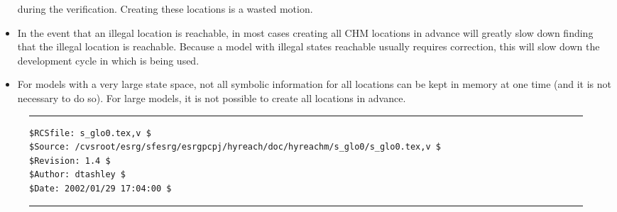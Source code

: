 \begin{glossaryenum}
\begin{itemize}
            during the verification.  Creating these locations is a wasted motion.
      \item In the event that an illegal location is reachable, in most cases
            creating all CHM locations
            in advance will greatly slow down finding 
            that the illegal location is reachable.  Because a model with illegal
            states reachable usually requires correction, this will slow down the 
            development cycle in which \swname{} is being used.
      \item For models with a very large state space, not all symbolic information for 
            all locations can be 
            kept in memory at one time (and it is not necessary to do so).  For large
            models, it is not
            possible to create all locations in advance.
      \end{itemize}
\end{glossaryenum}

\noindent\begin{figure}[!b]
\noindent\rule[-0.25in]{\textwidth}{1pt}
\begin{tiny}
\begin{verbatim}
$RCSfile: s_glo0.tex,v $
$Source: /cvsroot/esrg/sfesrg/esrgpcpj/hyreach/doc/hyreachm/s_glo0/s_glo0.tex,v $
$Revision: 1.4 $
$Author: dtashley $
$Date: 2002/01/29 17:04:00 $
\end{verbatim}
\end{tiny}
\noindent\rule[0.25in]{\textwidth}{1pt}
\end{figure}
%
%
%
%
